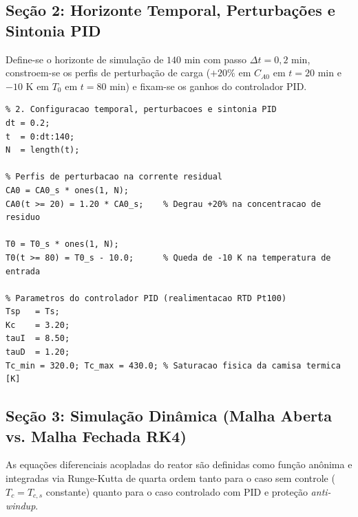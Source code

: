 \documentclass[11pt, a4paper]{article}
\begin{document}
\subsection{Seção 2: Horizonte Temporal, Perturbações e Sintonia PID}
Define-se o horizonte de simulação de $140\text{ min}$ com passo $\Delta t = 0{,}2\text{ min}$, constroem-se os perfis de perturbação de carga ($+20\%$ em $C_{A0}$ em $t = 20\text{ min}$ e $-10\text{ K}$ em $T_0$ em $t = 80\text{ min}$) e fixam-se os ganhos do controlador PID.

\begin{lstlisting}
% 2. Configuracao temporal, perturbacoes e sintonia PID
dt = 0.2;
t  = 0:dt:140;
N  = length(t);

% Perfis de perturbacao na corrente residual
CA0 = CA0_s * ones(1, N);
CA0(t >= 20) = 1.20 * CA0_s;    % Degrau +20% na concentracao de residuo

T0 = T0_s * ones(1, N);
T0(t >= 80) = T0_s - 10.0;      % Queda de -10 K na temperatura de entrada

% Parametros do controlador PID (realimentacao RTD Pt100)
Tsp   = Ts;
Kc    = 3.20;
tauI  = 8.50;
tauD  = 1.20;
Tc_min = 320.0; Tc_max = 430.0; % Saturacao fisica da camisa termica [K]
\end{lstlisting}

\subsection{Seção 3: Simulação Dinâmica (Malha Aberta vs. Malha Fechada RK4)}
As equações diferenciais acopladas do reator são definidas como função anônima e integradas via Runge-Kutta de quarta ordem tanto para o caso sem controle ($T_c = T_{c,s}$ constante) quanto para o caso controlado com PID e proteção \textit{anti-windup}.
\end{document}
